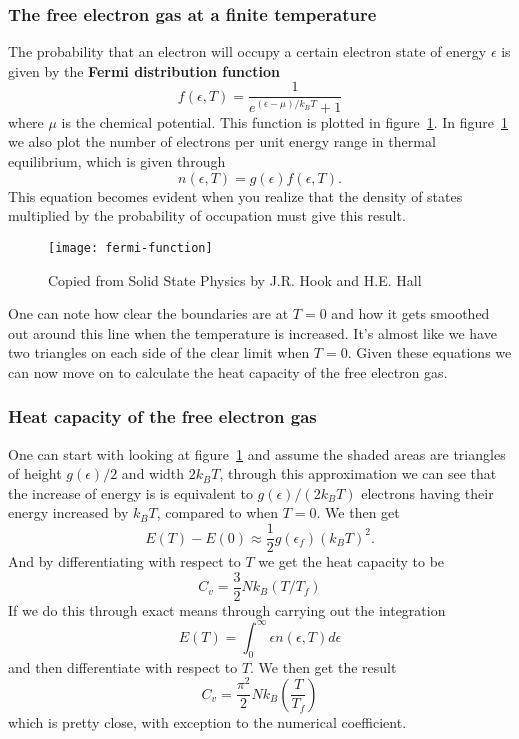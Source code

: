 \documentclass[11pt]{article}
\begin{document}
\subsubsection{The free electron gas at a finite temperature}
The probability that an electron will occupy a certain electron state of energy $\epsilon$ is given by the \textbf{Fermi distribution function}
\begin{equation}
	f(\epsilon,T) = \frac{1}{e^{(\epsilon - \mu)/k_B T} + 1}
\end{equation}
where $\mu$ is the chemical potential. This function is plotted in figure~\ref{fig:fermi-function}. In figure~\ref{fig:fermi-function} we also plot the number of electrons per unit energy range in thermal equilibrium, which is given through 
\begin{equation}
	n(\epsilon,T) = g(\epsilon)f(\epsilon,T).
\end{equation}
This equation becomes evident when you realize that the density of states multiplied by the probability of occupation must give this result.
\begin{figure}[!ht]
	\centering
	\texttt{[image: fermi-function]}
	\caption{Copied from Solid State Physics by J.R. Hook and H.E. Hall}
	\label{fig:fermi-function}
\end{figure}
One can note how clear the boundaries are at $T=0$ and how it gets smoothed out around this line when the temperature is increased. It's almost like we have two triangles on each side of the clear limit when $T=0$. Given these equations we can now move on to calculate the heat capacity of the free electron gas.
\subsubsection{Heat capacity of the free electron gas}
One can start with looking at figure~\ref{fig:fermi-function} and assume the shaded areas are triangles of height $g(\epsilon)/2$ and width $2k_B T$, through this approximation we can see that the increase of energy is is equivalent to $g(\epsilon)/(2 k_B T)$ electrons having their energy increased by $k_B T$, compared to when $T=0$. We then get
\begin{equation}
	E(T) - E(0) \approx \frac{1}{2}g(\epsilon_f)(k_B T)^2.
\end{equation}
And by differentiating with respect to $T$ we get the heat capacity to be
\begin{equation}
	C_v = \frac{3}{2} N k_B (T/T_f)
\end{equation}
If we do this through exact means through carrying out the integration 
\begin{equation}
	E(T) = \int_0^\infty \epsilon n(\epsilon, T) d\epsilon
\end{equation}
and then differentiate with respect to $T$. We then get the result
\begin{equation}
	C_v = \frac{\pi^2}{2} N k_B (\frac{T}{T_f})
\end{equation}
which is pretty close, with exception to the numerical coefficient.
\end{document}
